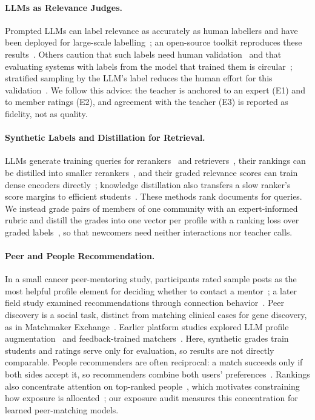 \documentclass[runningheads,a4paper]{llncs}
\begin{document}
\paragraph{LLMs as Relevance Judges.}
Prompted LLMs can label relevance as accurately as human labellers and have been
deployed for large-scale labelling~\cite{thomas2024preferences}; an open-source
toolkit reproduces these results~\cite{upadhyay2024umbrela}. Others caution that
such labels need human validation~\cite{faggioli2023perspectives,dietz2025judges}
and that evaluating systems with labels from the model that trained them is
circular~\cite{dietz2025judges,soboroff2025judgments};
stratified sampling by the LLM's label reduces the human effort for this
validation~\cite{merlo2026stratified}. We follow this advice: the teacher is
anchored to an expert (E1) and to member ratings (E2), and agreement with the
teacher (E3) is reported as fidelity, not as quality.

\paragraph{Synthetic Labels and Distillation for Retrieval.}
LLMs generate training queries for
rerankers~\cite{bonifacio2022inpars} and retrievers~\cite{dai2023promptagator}, their rankings can be
distilled into smaller rerankers~\cite{sun2023rankgpt}, and their graded relevance
scores can train dense encoders directly~\cite{bixse2025}; knowledge distillation
also transfers a slow ranker's score margins to efficient
students~\cite{hofstatter2020distillation}. These methods rank documents for
queries. We instead grade pairs of members of one community with an
expert-informed rubric and distill the grades into one vector per profile with a
ranking loss over graded labels~\cite{huang2024cosent}, so that newcomers need
neither interactions nor teacher calls.

\paragraph{Peer and People Recommendation.}
In a small cancer peer-mentoring study, participants rated sample posts as the most
helpful profile element for deciding whether to contact a mentor~\cite{hartzler2016peer}; a later field study examined recommendations
through connection behavior~\cite{levonian2025peer}. Peer discovery is a social
task, distinct from matching clinical cases for gene discovery, as in Matchmaker
Exchange~\cite{philippakis2015matchmaker}. Earlier platform studies explored LLM
profile augmentation~\cite{berger2024tackling} and feedback-trained
matchers~\cite{berger2024advancing,berger2024optimizing}. Here, synthetic grades
train students and ratings serve only for evaluation, so results are not directly
comparable. People recommenders are often reciprocal: a match succeeds only if both
sides accept it, so recommenders combine both users'
preferences~\cite{pizzato2010recon,palomares2021reciprocal}. Rankings also
concentrate attention on top-ranked people~\cite{biega2018attention}, which
motivates constraining how exposure is allocated~\cite{singh2018exposure}; our
exposure audit measures this concentration for learned peer-matching models.
\end{document}
